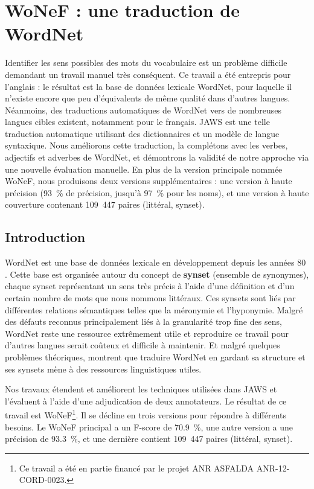 \chapter{WoNeF : une traduction de WordNet}
\label{ch:wonef} 

Identifier les sens possibles des mots du vocabulaire est un problème difficile
demandant un travail manuel très conséquent. Ce travail a été entrepris pour
l'anglais : le résultat est la base de données lexicale WordNet, pour laquelle
il n'existe encore que peu d'équivalents de même qualité dans d'autres langues.
Néanmoins, des traductions automatiques de WordNet vers de nombreuses langues
cibles existent, notamment pour le français. JAWS est une telle traduction
automatique utilisant des dictionnaires et un modèle de langue syntaxique. Nous
améliorons cette traduction, la complétons avec les verbes, adjectifs et
adverbes de WordNet, et démontrons la validité de notre approche via une
nouvelle évaluation manuelle. En plus de la version principale nommée WoNeF,
nous produisons deux versions supplémentaires : une version à haute précision
(93~\% de précision, jusqu'à 97~\% pour les noms), et une version à haute
couverture contenant 109~447 paires (littéral, synset).


\section{Introduction}
\label{sec:intro}

WordNet est une base de données lexicale en développement depuis les années 80
\citep{fellbaum1998wordnet}. Cette base est organisée autour du concept de
\textbf{synset} (ensemble de synonymes), chaque synset représentant un sens
très précis à l'aide d'une définition et d'un certain nombre de mots que nous
nommons littéraux. Ces synsets sont liés par différentes relations sémantiques
telles que la méronymie et l'hyponymie. Malgré des défauts reconnus
\citep{boyd2006adding} principalement liés à la granularité trop fine des sens,
WordNet reste une ressource extrêmement utile et reproduire ce travail pour
d'autres langues serait coûteux et difficile à maintenir. Et malgré quelques
problèmes théoriques, \cite{fellbaum2007connecting,demelo2008utility} montrent
que traduire WordNet en gardant sa structure et ses synsets mène à des
ressources linguistiques utiles.


Nos travaux étendent et améliorent les techniques utilisées dans JAWS et
l'évaluent à l'aide d'une adjudication de deux annotateurs. Le résultat de ce
travail est WoNeF\footnote{Ce travail a été en partie financé par le projet ANR
ASFALDA ANR-12-CORD-0023.}. Il se décline en trois versions pour répondre à
différents besoins. Le WoNeF principal a un F-score de 70.9~\%, une autre
version a une précision de 93.3~\%, et une dernière contient 109~447 paires
(littéral, synset).


